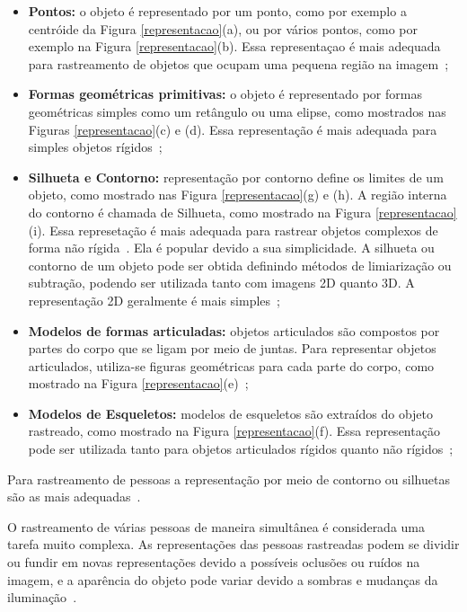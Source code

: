 	\begin{itemize}
		\item \textbf{Pontos:} o objeto é representado por um ponto, como por exemplo a centróide da Figura \ref{representacao}(a), ou por vários pontos, como por exemplo na Figura \ref{representacao}(b). Essa representaçao é mais adequada para rastreamento de objetos que ocupam uma pequena região na imagem~\cite{yilmaz};

		\item \textbf{Formas geométricas primitivas:} o objeto é representado por formas geométricas simples como um retângulo ou uma elipse, como mostrados nas Figuras \ref{representacao}(c) e (d). Essa representação é mais adequada para simples objetos rígidos~\cite{yilmaz};

		\item \textbf{Silhueta e Contorno:} representação por contorno define os limites de um objeto, como mostrado nas Figura \ref{representacao}(g) e (h). A região interna do contorno é chamada de Silhueta, como mostrado na Figura \ref{representacao}(i). Essa represetação é mais adequada para rastrear objetos complexos de forma não rígida~\cite{yilmaz}. Ela é popular devido a sua simplicidade. A silhueta ou contorno de um objeto pode ser obtida definindo métodos de limiarização ou subtração, podendo ser utilizada tanto com imagens 2D quanto 3D. A representação 2D geralmente é mais simples~\cite{moeslund};

		\item \textbf{Modelos de formas articuladas:} objetos articulados são compostos por partes do corpo que se ligam por meio de juntas. Para representar objetos articulados, utiliza-se figuras geométricas para cada parte do corpo, como mostrado na Figura \ref{representacao}(e)~\cite{yilmaz};

		\item \textbf{Modelos de Esqueletos:} modelos de esqueletos são extraídos do objeto rastreado, como mostrado na Figura \ref{representacao}(f). Essa representação pode ser utilizada tanto para objetos articulados rígidos quanto não rígidos~\cite{yilmaz};
	\end{itemize}

	Para rastreamento de pessoas a representação por meio de contorno ou silhuetas são as mais adequadas~\cite{yilmaz}.

	O rastreamento de várias pessoas de maneira simultânea é considerada uma tarefa muito complexa. As representações das pessoas rastreadas podem se dividir ou fundir em novas representações devido a possíveis oclusões ou ruídos na imagem, e a aparência do objeto pode variar devido a sombras e mudanças da iluminação~\cite{moeslund}.


